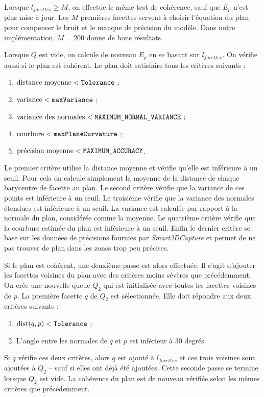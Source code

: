 ﻿\documentclass[12pt, twoside]{article}
\begin{document}
Lorsque $l_{facettes} \geq M$, on effectue le même test de cohérence, sauf que $E_p$ n'est plus mise à jour. Les $M$ premières facettes servent à choisir l'équation du plan pour compenser le bruit et le manque de précision du modèle. Dans notre implémentation, $M = 200$ donne de bons résultats.

Lorsque $Q$ est vide, on calcule de nouveau $E_p$ en se basant sur $l_{facettes}$. On vérifie aussi si le plan est cohérent. Le plan doit satisfaire tous les critères suivants :
\begin{enumerate}
  \item $\text{distance moyenne} < \text{\texttt{Tolerance}}$ ;
  \item $\text{variance} < \text{\texttt{maxVariance}}$ ;
  \item $\text{variance des normales} < \text{\texttt{MAXIMUM\_NORMAL\_VARIANCE}}$ ;
  \item $\text{courbure} < \text{\texttt{maxPlaneCurvature}}$ ;
  \item $\text{précision moyenne} < \text{\texttt{MAXIMUM\_ACCURACY}}$.
\end{enumerate}
Le premier critère utilise la distance moyenne et vérifie qu'elle est inférieure à un seuil. Pour cela on calcule simplement la moyenne de la distance de chaque barycentre de facette au plan. Le second critère vérifie que la variance de ces points est inférieure à un seuil. Le troisième vérifie que la variance des normales étendues est inférieure à un seuil. La variance est calculée par rapport à la normale du plan, considérée comme la moyenne. Le quatrième critère vérifie que la courbure estimée du plan est inférieure à un seuil. Enfin le dernier critère se base sur les données de précisions fournies par \textit{Smart3DCapture} et permet de ne pas trouver de plan dans les zones trop peu précises.

Si le plan est cohérent, une deuxième passe est alors effectuée. Il s'agit d'ajouter les facettes voisines du plan avec des critères moins sévères que précédemment. On crée une nouvelle queue $Q_2$ qui est initialisée avec toutes les facettes voisines de $p$. La première facette $q$ de $Q_2$ est sélectionnée. Elle doit répondre aux deux critères suivants :
\begin{enumerate}
  \item $\text{dist}(q, p) < \text{\texttt{Tolerance}}$ ;
  \item L'angle entre les normales de $q$ et $p$ est inférieur à 30 degrés.
\end{enumerate}
Si $q$ vérifie ces deux critères, alors $q$ est ajouté à $l_{facettes}$ et ces trois voisines sont ajoutées à $Q_2$ -- sauf si elles ont déjà été ajoutées. Cette seconde passe se termine lorsque $Q_2$ est vide. La cohérence du plan est de nouveau vérifiée selon les mêmes critères que précédemment.
\end{document}
